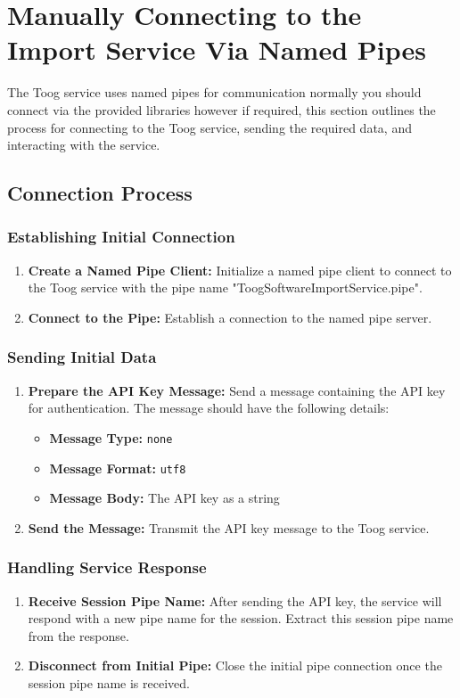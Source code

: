 \documentclass{memoir}
\begin{document}
	\section{Manually Connecting to the Import Service Via Named Pipes}
	
	The Toog service uses named pipes for communication normally you should connect via the provided libraries however if required, this section outlines the process for connecting to the Toog service, sending the required data, and interacting with the service.
	
	\subsection{Connection Process}
	
	\subsubsection{Establishing Initial Connection}
	\begin{enumerate}
		\item \textbf{Create a Named Pipe Client:} Initialize a named pipe client to connect to the Toog service with the pipe name "ToogSoftwareImportService.pipe".
		\item \textbf{Connect to the Pipe:} Establish a connection to the named pipe server.
	\end{enumerate}
	
	\subsubsection{Sending Initial Data}
	\begin{enumerate}
		\item \textbf{Prepare the API Key Message:} Send a message containing the API key for authentication. The message should have the following details:
		\begin{itemize}
			\item \textbf{Message Type:} \texttt{none}
			\item \textbf{Message Format:} \texttt{utf8}
			\item \textbf{Message Body:} The API key as a string
		\end{itemize}
		\item \textbf{Send the Message:} Transmit the API key message to the Toog service.
	\end{enumerate}
	
	\subsubsection{Handling Service Response}
	\begin{enumerate}
		\item \textbf{Receive Session Pipe Name:} After sending the API key, the service will respond with a new pipe name for the session. Extract this session pipe name from the response.
		\item \textbf{Disconnect from Initial Pipe:} Close the initial pipe connection once the session pipe name is received.
	\end{enumerate}
	
\end{document}
